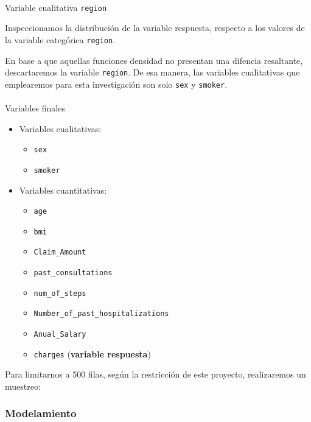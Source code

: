 \documentclass[
]{article}
\makeatletter
\let\oldparagraph\paragraph
\renewcommand{\paragraph}{
    \@ifstar
      \xxxParagraphStar
      \xxxParagraphNoStar
  }
\newcommand{\xxxParagraphStar}[1]{\oldparagraph*{#1}\mbox{}}
\newcommand{\xxxParagraphNoStar}[1]{\oldparagraph{#1}\mbox{}}
\providecommand{\tightlist}{%
  \setlength{\itemsep}{0pt}\setlength{\parskip}{0pt}}\usepackage{longtable,booktabs,array}
\makeatother
\begin{document}
\paragraph{\texorpdfstring{Variable cualitativa
\texttt{region}}{Variable cualitativa region}}\label{variable-cualitativa-region}

Inspeccionamos la distribución de la variable respuesta, respecto a los
valores de la variable categórica \texttt{region}.

En base a que aquellas funciones densidad no presentan una difencia
resaltante, descartaremos la variable \texttt{region}. De esa manera,
las variables cualitativas que emplearemos para esta investigación son
solo \texttt{sex} y \texttt{smoker}.

\paragraph{Variables finales}\label{variables-finales}

\begin{itemize}
\tightlist
\item
  Variables cualitativas:

  \begin{itemize}
  \tightlist
  \item
    \texttt{sex}
  \item
    \texttt{smoker}
  \end{itemize}
\item
  Variables cuantitativas:

  \begin{itemize}
  \tightlist
  \item
    \texttt{age}
  \item
    \texttt{bmi}
  \item
    \texttt{Claim\_Amount}
  \item
    \texttt{past\_consultations}
  \item
    \texttt{num\_of\_steps}
  \item
    \texttt{Number\_of\_past\_hospitalizations}
  \item
    \texttt{Anual\_Salary}
  \item
    \texttt{charges} (\textbf{variable respuesta})
  \end{itemize}
\end{itemize}

Para limitarnos a 500 filas, según la restricción de este proyecto,
realizaremos un muestreo:

\subsubsection{Modelamiento}\label{modelamiento}
\end{document}
